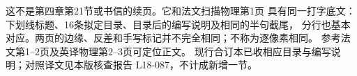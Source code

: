 
这不是第四章第21节或书信的续页。它和法文扫描物理第1页
具有同一打字底文：下划线标题、16条拟定目录、目录后的编写说明及相同的半句截尾，
分行也基本对应。两页的边缘、反差和手写标记并不完全相同；不称为逐像素相同。
参考法文第1--2页及英译物理第2--3页可定位正文。
现行合订本已收相应目录与编写说明；对照译文见本版核查报告 L18-087，不计成新增一节。
\par\endgroup
